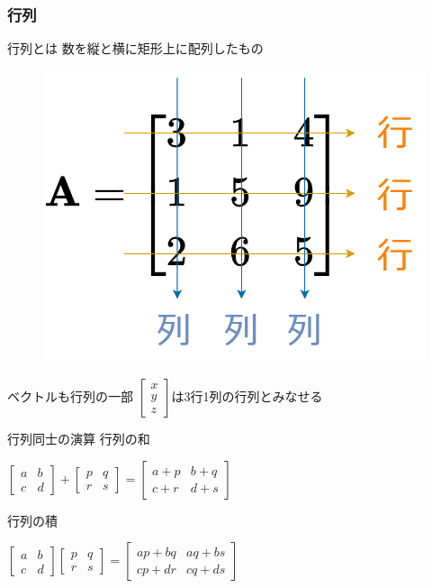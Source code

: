 \documentclass[dvipdfmx,aspectratio=169]{beamer}
\begin{document}
	\subsubsection{行列}
	\begin{frame}{行列とは}
		数を縦と横に矩形上に配列したもの
		\begin{figure}
			\centering
			\includegraphics[width=0.4\linewidth]{img/example-of-matrix}
		\end{figure}
	\end{frame}
	\begin{frame}{ベクトルも行列の一部}
		$ \begin{bmatrix}
			x\\ y\\ z
		\end{bmatrix} $は3行1列の行列とみなせる
	\end{frame}
	\begin{frame}{行列同士の演算}
		行列の和
		
		$ \begin{bmatrix}
			a&b\\
			c&d
		\end{bmatrix} + \begin{bmatrix}
			p&q\\
			r&s
		\end{bmatrix} = \begin{bmatrix}
			a+p & b+q\\
			c+r & d+s
		\end{bmatrix} $
		
		行列の積
		
		$ \begin{bmatrix}
			a&b\\
			c&d
		\end{bmatrix}\begin{bmatrix}
			p&q\\
			r&s
		\end{bmatrix} = \begin{bmatrix}
			ap+bq & aq+bs\\
			cp+dr & cq+ds
		\end{bmatrix} $
	\end{frame}
\end{document}
